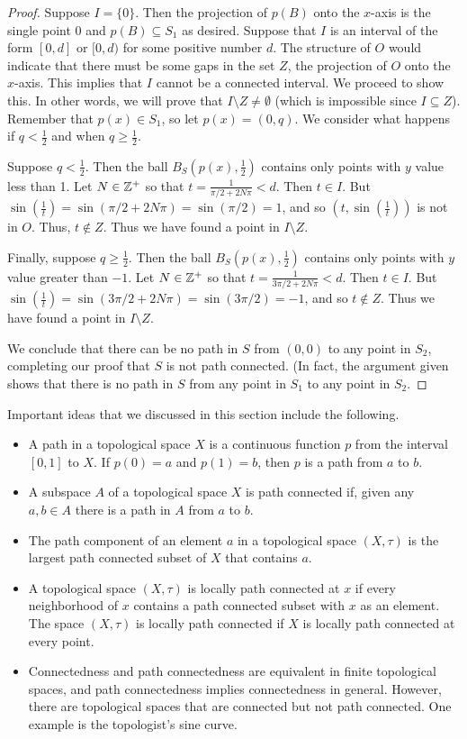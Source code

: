 \begin{proof}
Suppose $I = \{0\}$. Then the projection of $p(B)$ onto the $x$-axis is the single point $0$ and $p(B) \subseteq S_1$ as desired. Suppose that $I$ is an interval of the form $[0,d]$ or $[0,d)$ for some positive number $d$. The structure of $O$ would indicate that there must be some gaps in the set $Z$, the projection of $O$ onto the $x$-axis. This implies that $I$ cannot be a connected interval. We proceed to show this. In other words, we will prove that $I \setminus Z \neq \emptyset$ (which is impossible since $I \subseteq Z$). Remember that $p(x) \in S_1$, so let $p(x) = (0, q)$. We consider what happens if $q < \frac{1}{2}$ and when $q \geq \frac{1}{2}$.  

Suppose $q < \frac{1}{2}$. Then the ball $B_S\left(p(x), \frac{1}{2}\right)$ contains only points with $y$ value less than 1. Let $N \in \mathbb{Z}^+$ so that $t=\frac{1}{\pi/2+2N\pi} < d$. Then $t \in I$. But $\sin\left(\frac{1}{t}\right) = \sin(\pi/2 + 2N\pi) = \sin(\pi/2) = 1$, and so $\left(t,\sin\left(\frac{1}{t}\right)\right)$ is not in $O$. Thus, $t \notin Z$. Thus we have found a point in $I \setminus Z$. 

Finally, suppose $q \geq \frac{1}{2}$. Then the ball $B_S\left(p(x), \frac{1}{2}\right)$ contains only points with $y$ value greater than $-1$. Let $N \in \mathbb{Z}^+$ so that $t=\frac{1}{3\pi/2+2N\pi} < d$. Then $t \in I$. But $\sin\left(\frac{1}{t}\right) = \sin(3\pi/2 + 2N\pi) = \sin(3\pi/2) = -1$, and so $t \notin Z$. Thus we have found a point in $I \setminus Z$. 

We conclude that there can be no path in $S$ from $(0,0)$ to any point in $S_2$, completing our proof that $S$ is not path connected. (In fact, the  argument given shows that there is no path in $S$ from any point in $S_1$ to any point in $S_2$. 
\end{proof}

\label{sec_path_summ}
Important ideas that we discussed in this section include the following.
\begin{itemize}
\item A path in a topological space $X$ is a continuous function $p$ from the interval $[0,1]$ to $X$. If $p(0) = a$ and $p(1) = b$, then $p$ is a path from $a$ to $b$. 
\item A subspace $A$ of a topological space $X$ is path connected if, given any $a, b \in A$ there is a path in $A$ from $a$ to $b$.
\item The path component of an element $a$ in a topological space $(X, \tau)$ is the largest path connected subset of $X$ that contains $a$. 
\item A topological space $(X, \tau)$ is locally path connected at $x$ if every neighborhood of $x$ contains a path connected subset with $x$ as an element. The space $(X, \tau)$ is locally path connected if $X$ is locally path connected at every point.
\item Connectedness and path connectedness are equivalent in finite topological spaces, and path connectedness implies connectedness in general. However, there are topological spaces that are connected but not path connected. One example is the topologist's sine curve. 
\end{itemize}


